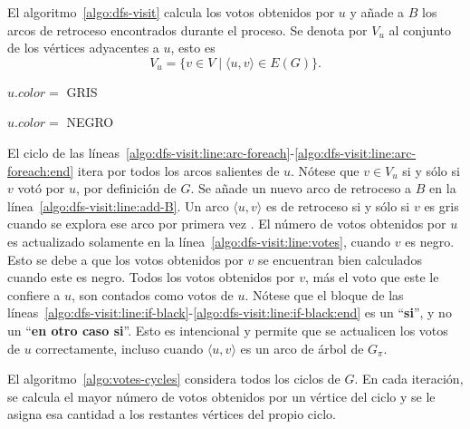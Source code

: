 El algoritmo~\ref{algo:dfs-visit} calcula los votos obtenidos por $u$ y a\~nade a $B$ los arcos de retroceso encontrados durante el proceso. Se denota por $V_u$ al conjunto de los v\'ertices adyacentes a $u$, esto es
$$
V_u = \{ v \in V \;|\; \langle u, v \rangle \in E(G) \}.
$$

\begin{algorithm}[!h]
    \caption{\dfsvisitcaption}
    \label{algo:dfs-visit}
    \DontPrintSemicolon
    \BlankLine

    $u.color =$ GRIS\;

    \label{algo:dfs-visit:line:arc-foreach:end}
    $u.color =$ NEGRO\;\label{algo:dfs-visit:line:set-black}
\end{algorithm}

El ciclo de las l\'ineas~\ref{algo:dfs-visit:line:arc-foreach}-\ref{algo:dfs-visit:line:arc-foreach:end} itera por todos los arcos salientes de $u$. N\'otese que $v \in V_u$ si y s\'olo si $v$ vot\'o por $u$, por definici\'on de $G$.  Se a\~nade un nuevo arco de retroceso a $B$ en la l\'inea~\ref{algo:dfs-visit:line:add-B}. Un arco $\langle u, v \rangle$ es de retroceso si y s\'olo si $v$ es gris cuando se explora ese arco por primera vez \citep{intro-to-algo-3}. El n\'umero de votos obtenidos por $u$ es actualizado solamente en la l\'inea~\ref{algo:dfs-visit:line:votes}, cuando $v$ es negro. Esto se debe a que los votos obtenidos por $v$ se encuentran bien calculados cuando este es negro. Todos los votos obtenidos por $v$, m\'as el voto que este le confiere a $u$, son contados como votos de  $u$. N\'otese que el bloque de las l\'ineas~\ref{algo:dfs-visit:line:if-black}-\ref{algo:dfs-visit:line:if-black:end} es un ``\textbf{si}'', y no un ``\textbf{en otro caso si}''. Esto es intencional y permite que se actualicen los votos de $u$ correctamente, incluso cuando $\langle u, v \rangle$ es un arco de \'arbol de $G_\pi$. 

El algoritmo~\ref{algo:votes-cycles} considera todos los ciclos de $G$. En cada iteraci\'on, se calcula el mayor n\'umero de votos obtenidos por un v\'ertice del ciclo y se le asigna esa cantidad a los restantes v\'ertices del propio ciclo. 



